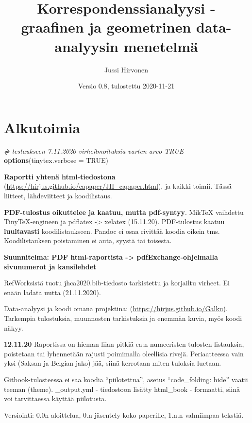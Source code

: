 \documentclass[
  finnish,
]{book}
\title{Korrespondenssianalyysi - graafinen ja geometrinen data-analyysin menetelmä}
\author{Jussi Hirvonen}
\date{Versio 0.8, tulostettu 2020-11-21}
\newenvironment{Shaded}{\begin{snugshade}}{\end{snugshade}}
\newcommand{\CommentTok}[1]{\textcolor[rgb]{0.56,0.35,0.01}{\textit{#1}}}
\newcommand{\DataTypeTok}[1]{\textcolor[rgb]{0.13,0.29,0.53}{#1}}
\newcommand{\KeywordTok}[1]{\textcolor[rgb]{0.13,0.29,0.53}{\textbf{#1}}}
\newcommand{\NormalTok}[1]{#1}
\newcommand{\OtherTok}[1]{\textcolor[rgb]{0.56,0.35,0.01}{#1}}
\begin{document}
\maketitle

{
\setcounter{tocdepth}{1}
\tableofcontents
}
\hypertarget{alkutoimia}{%
\chapter*{Alkutoimia}\label{alkutoimia}}

\begin{Shaded}
\begin{Highlighting}[]
\CommentTok{# testaukseen 7.11.2020 virheilmoituksia varten arvo TRUE}
\KeywordTok{options}\NormalTok{(}\DataTypeTok{tinytex.verbose =} \OtherTok{TRUE}\NormalTok{)}
\end{Highlighting}
\end{Shaded}

\textbf{Raportti yhtenä html-tiedostona} (\url{https://hirjus.github.io/capaper/JH_capaper.html}), ja kaikki toimii.
Tässä liitteet, lähdeviitteet ja koodilistaus.

\textbf{PDF-tulostus oikuttelee ja kaatuu, mutta pdf-syntyy}. MikTeX vaihdettu TinyTeX-engineen
ja pdflatex -\textgreater{} xelatex (15.11.20). PDF-tulostus kaatuu \textbf{luultavasti} koodilistaukseen.
Pandoc ei osaa rivittää koodia oikein tms. Koodilistauksen poistaminen ei auta, syystä tai toisesta.

\textbf{Suunnitelma: PDF html-raportista -\textgreater{} pdfExchange-ohjelmalla sivunumerot ja kansilehdet}

RefWorksistä tuotu jhca2020.bib-tiedosto tarkistettu ja korjailtu virheet. Ei enään ladata uutta (21.11.2020).

Data-analyysi ja koodi omana projektina: (\url{https://hirjus.github.io/Galku}). Tarkempia tulostuksia,
muunnosten tarkistuksia ja enemmän kuvia, myös koodi näkyy.

\textbf{12.11.20}
Raportissa on hieman liian pitkiä ca:n numeeristen tulosten listauksia, poistetaan tai
lyhennetään rajusti poimimalla oleellisia rivejä. Periaatteessa vain yksi (Saksan ja Belgian jako)
jää, siinä kerrotaan miten tuloksia luetaan.

Gitbook-tulosteessa ei saa koodia ``piilotettua'', asetus ``code\_folding: hide'' vaatii
teeman (theme). \_output.yml - tiedostoon lisätty html\_book - formaatti, siinä
voi tarvittaessa käyttää piilotusta.

Versiointi: 0.0n aloittelua, 0.n jäsentely koko paperille, 1.n.n valmiimpaa tekstiä.
\end{document}
